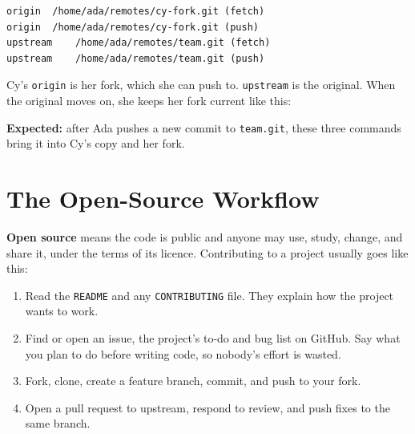 \begin{codeblock}
\begin{Verbatim}[formatcom=\outputstyle]
origin  /home/ada/remotes/cy-fork.git (fetch)
origin  /home/ada/remotes/cy-fork.git (push)
upstream    /home/ada/remotes/team.git (fetch)
upstream    /home/ada/remotes/team.git (push)
\end{Verbatim}
\end{codeblock}


Cy's \texttt{origin} is her fork, which she can push to. \texttt{upstream} is the original. When the original moves on, she keeps her fork current like this:

\begin{codeblock}

\begin{Shaded}
\begin{Highlighting}[]
\end{Highlighting}
\end{Shaded}

\end{codeblock}

\textbf{Expected:} after Ada pushes a new commit to \texttt{team.git}, these three commands bring it into Cy's copy and her fork.

\section{The Open-Source Workflow}\label{11-lab-work-on-a-project-with-someone-else:the-open-source-workflow}

\textbf{Open source} means the code is public and anyone may use, study, change, and share it, under the terms of its licence. Contributing to a project usually goes like this:

\begin{enumerate}
\def\labelenumi{\arabic{enumi}.}
\tightlist
\item
  Read the \texttt{README} and any \texttt{CONTRIBUTING} file. They explain how the project wants to work.
\item
  Find or open an issue, the project's to-do and bug list on GitHub. Say what you plan to do before writing code, so nobody's effort is wasted.
\item
  Fork, clone, create a feature branch, commit, and push to your fork.
\item
  Open a pull request to upstream, respond to review, and push fixes to the same branch.
\end{enumerate}

